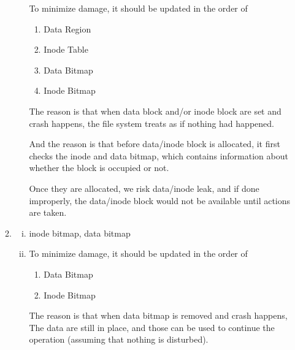 \documentclass[12pt]{article}
\begin{document}
\begin{enumerate}[1.]
\begin{enumerate}[1)]
\begin{enumerate}[i)]
            To minimize damage, it should be updated in the order of

            \bigskip

            \begin{enumerate}[1.]
                \item Data Region
                \item Inode Table
                \item Data Bitmap
                \item Inode Bitmap
            \end{enumerate}

            \bigskip

            The reason is that when data block and/or inode block are set and
            crash happens, the file system treats as if nothing had happened.

            \bigskip

            And the reason is that before data/inode block is allocated, it first checks
            the inode and data bitmap, which contains information about whether the block is occupied or not.

            \bigskip

            Once they are allocated, we risk data/inode leak, and if done improperly,
            the data/inode block would not be available until actions are taken.
        \end{enumerate}

        \item

        \begin{enumerate}[i)]
            \item inode bitmap, data bitmap
            \item

            To minimize damage, it should be updated in the order of

            \bigskip

            \begin{enumerate}[1.]
                \item Data Bitmap
                \item Inode Bitmap
            \end{enumerate}

            \bigskip

            The reason is that when data bitmap is removed and crash happens,
            The data are still in place, and those can be used to continue the operation
            (assuming that nothing is disturbed).


\end{enumerate}
\end{enumerate}
\end{enumerate}
\end{document}
